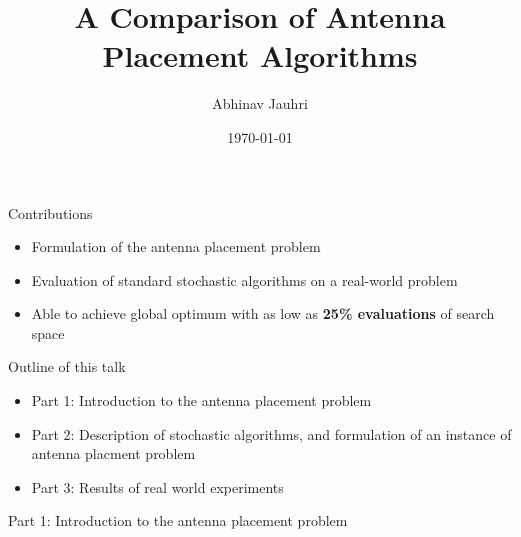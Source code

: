 \documentclass{beamer}
\title{\color{univred} A Comparison of Antenna Placement Algorithms}
\author{Abhinav Jauhri}
\date{\today}
\begin{document}
\begin{frame}
    \color{univred}
    \titlepage
\end{frame}

\begin{frame}[t]{Contributions}
    \begin{itemize}
        \item Formulation of the antenna placement problem
        \item Evaluation of standard stochastic algorithms on a real-world problem
        \item Able to achieve global optimum with as low as \textbf{25\% evaluations} of search space
    \end{itemize}
    \vspace{5mm}
\end{frame}


\begin{frame}{Outline of this talk}
    \begin{itemize}
        \setlength\itemsep{2em}
        \item Part 1: Introduction to the antenna placement problem
        \item Part 2: Description of stochastic algorithms, and formulation of an instance of antenna placment problem
        \item Part 3: Results of real world experiments
    \end{itemize}
\end{frame}

\begin{frame}{\null}
    \begin{tcolorbox}[colback=green!5]
        \centering\Huge
        Part 1: Introduction to the antenna placement problem
    \end{tcolorbox}
\end{frame}
\end{document}
